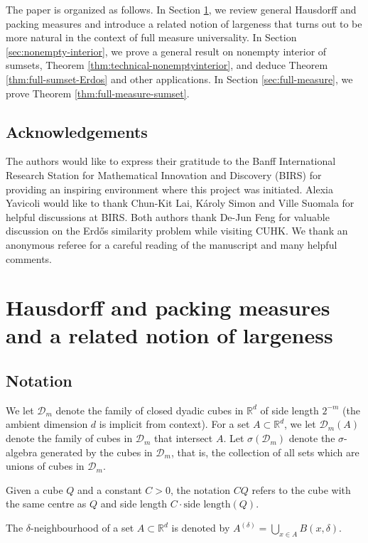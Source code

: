 \documentclass[12pt]{amsart}
\def\R{{\mathbb{R}}}
\numberwithin{theorem}{section}
\numberwithin{equation}{section}
\begin{document}
The paper is organized as follows. In Section \ref{sec:largeness}, we review general Hausdorff and packing measures and introduce a related notion of largeness that turns out to be more natural in the context of full measure universality. In Section \ref{sec:nonempty-interior}, we prove a general result on nonempty interior of sumsets, Theorem \ref{thm:technical-nonemptyinterior}, and deduce Theorem \ref{thm:full-sumset-Erdos} and other applications. In Section \ref{sec:full-measure}, we prove Theorem \ref{thm:full-measure-sumset}.

\subsection*{Acknowledgements}
The authors would like to express their gratitude to the Banff International Research Station for Mathematical Innovation and Discovery (BIRS) for providing an inspiring environment where this project was initiated. Alexia Yavicoli would like to thank Chun-Kit Lai, Károly Simon and Ville Suomala for helpful discussions at BIRS. Both authors thank De-Jun Feng for valuable discussion on the Erd\H{o}s similarity problem while visiting CUHK. We thank an anonymous referee for a careful reading of the manuscript and many helpful comments.

\section{Hausdorff and packing measures and a related notion of largeness}

\label{sec:largeness}

\subsection{Notation}

We let $\mathcal{D}_m$ denote the family of closed dyadic cubes in $\R^d$ of side length $2^{-m}$ (the ambient dimension $d$ is implicit from context). For a set $A\subset\R^d$, we let $\mathcal{D}_m(A)$ denote the family of cubes in $\mathcal{D}_m$ that intersect $A$. Let $\sigma(\mathcal{D}_m)$ denote the $\sigma$-algebra generated by the cubes in $\mathcal{D}_m$, that is, the collection of all sets which are unions of cubes in $\mathcal{D}_m$.

Given a cube $Q$ and a constant $C>0$, the notation $CQ$ refers to the cube with the same centre as $Q$ and side length $C\cdot \text{side length}(Q)$.

The $\delta$-neighbourhood of a set $A\subset \R^d$ is denoted by $A^{(\delta)}=\bigcup_{x\in A} B(x,\delta)$.
\end{document}
